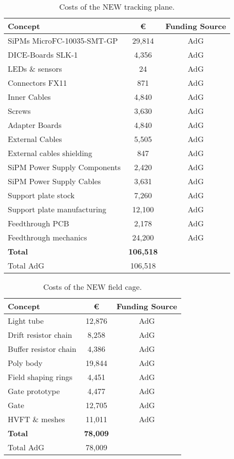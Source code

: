 \begin{table}[h!]
\begin{center}
\begin{tabular}{|l|c|c|}
\hline
 Concept & \euro & Funding Source \\
 \hline
SiPMs MicroFC-10035-SMT-GP &	29,814 & AdG \\
DICE-Boards SLK-1	&	4,356 & AdG \\
LEDs \& sensors	&	24 & AdG \\
Connectors FX11	&	871 & AdG \\
Inner Cables	&	4,840 & AdG \\
Screws	&	3,630 & AdG \\
Adapter Boards &	4,840 & AdG \\
External Cables &	5,505 & AdG \\
External cables shielding	&	847 & AdG \\
SiPM Power Supply Components	& 2,420 & AdG \\
SiPM Power Supply Cables	& 3,631 & AdG \\
Support plate stock	& 7,260 & AdG \\
Support plate manufacturing  & 12,100 &  AdG \\
 Feedthrough PCB	&	2,178 & AdG \\
Feedthrough mechanics &	 24,200 & AdG \\
  \hline
{\bf Total}	&	{\bf 106,518}	& \\
  Total AdG	&	106,518 	& \\
 \hline\hline
\end{tabular}  
\caption{Costs of the NEW tracking plane.}
\label{tab.new:TP}
\end{center}
\end{table} 

\begin{table}[h!]
\begin{center}
\begin{tabular}{|l|c|c|}
\hline
 Concept & \euro & Funding Source \\
 \hline
 Light tube & 12,876 & AdG \\
 Drift resistor chain & 8,258 & AdG \\
 Buffer resistor chain & 4,386 & AdG\\
 Poly body & 19,844 & AdG \\
 Field shaping rings & 4,451 & AdG \\
 Gate prototype & 4,477 & AdG \\
 Gate & 12,705 & AdG \\
 HVFT \& meshes & 11,011 & AdG \\
  \hline
{\bf Total} &	{\bf 78,009}	& \\
  Total AdG	&	78,009	& \\
 \hline\hline
\end{tabular}  
\caption{Costs of the NEW field cage.}
\label{tab.new:FC}
\end{center}
\end{table} 

